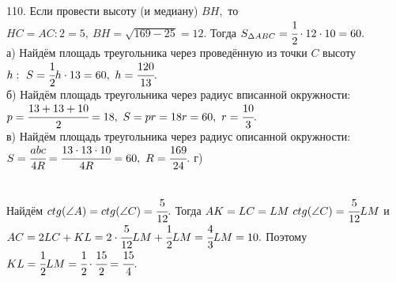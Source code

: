 110. Если провести высоту (и медиану) $BH,$ то $HC=AC:2=5,\ BH=\sqrt{169-25}=12.$ Тогда $S_{\Delta ABC}=\cfrac{1}{2}\cdot12\cdot10=60.$\\
а) Найдём площадь треугольника через проведённую из точки $C$ высоту $h:\ S=\cfrac{1}{2}h\cdot13=60,\ h=\cfrac{120}{13}.$\\
б) Найдём площадь треугольника через радиус вписанной окружности: $p=\cfrac{13+13+10}{2}=18,\ S=pr=18r=60,\ r=\cfrac{10}{3}.$\\
в) Найдём площадь треугольника через радиус описанной окружности: $S=\cfrac{abc}{4R}=\cfrac{13\cdot13\cdot10}{4R}=60,\ R=\cfrac{169}{24}.$\newpage\noindent
г) \begin{figure}[ht!]
\end{figure}\\
Найдём $ctg(\angle A)=ctg(\angle C)=\cfrac{5}{12}.$ Тогда $AK=LC=LM\ ctg(\angle C)=\cfrac{5}{12}LM$ и $AC=2LC+KL=2\cdot\cfrac{5}{12}LM+\cfrac{1}{2}LM=\cfrac{4}{3}LM=10.$ Поэтому $KL=\cfrac{1}{2}LM=\cfrac{1}{2}\cdot\cfrac{15}{2}=\cfrac{15}{4}.$\\

